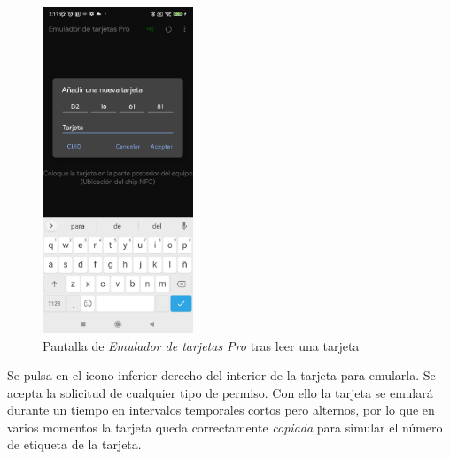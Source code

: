 \documentclass[12pt,a4paper,onecolumn,oneside]{report}
\begin{document}
\begin{figure}[H] 
\centering
  \includegraphics[width=0.4\textwidth]{figuras/root7.png}
  \caption[Pantalla de \textit{Emulador de tarjetas Pro} tras leer una tarjeta]{Pantalla de \textit{Emulador de tarjetas Pro} tras leer una tarjeta\\
  }
  \label{fig:root7}
\end{figure}

Se pulsa en el icono inferior derecho del interior de la tarjeta para emularla. Se acepta la solicitud de cualquier tipo de permiso. Con ello la tarjeta se emulará durante un tiempo en intervalos temporales cortos pero alternos, por lo que en varios momentos la tarjeta queda correctamente \textit{copiada} para simular el número de etiqueta de la tarjeta.
\end{document}
